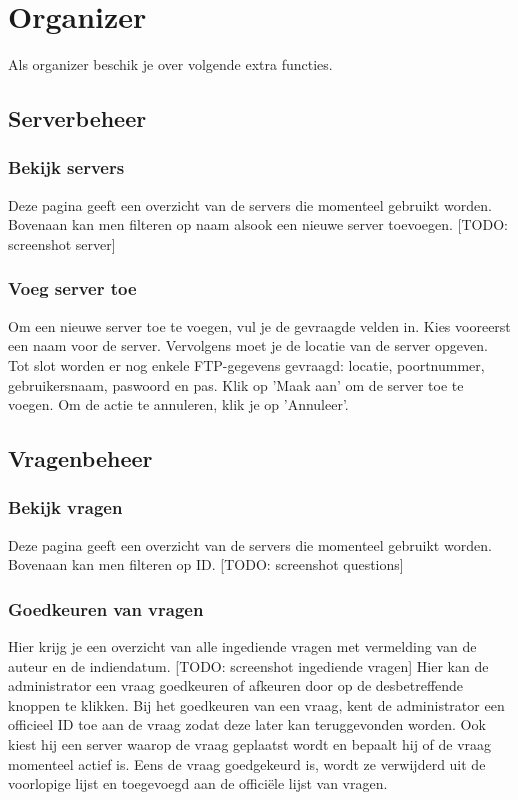 \documentclass[]{article}
\begin{document}
\section{Organizer}

Als organizer beschik je over volgende extra functies.

\subsection{Serverbeheer}

\subsubsection{Bekijk servers}
Deze pagina geeft een overzicht van de servers die momenteel gebruikt worden. Bovenaan kan men filteren op naam alsook een nieuwe server toevoegen. [TODO: screenshot server]

\subsubsection{Voeg server toe}
Om een nieuwe server toe te voegen, vul je de gevraagde velden in. Kies vooreerst een naam voor de server. Vervolgens moet je de locatie van de server opgeven. Tot slot worden er nog enkele FTP-gegevens gevraagd: locatie, poortnummer, gebruikersnaam, paswoord en pas. Klik op 'Maak aan' om de server toe te voegen. Om de actie te annuleren, klik je op 'Annuleer'.

\subsection{Vragenbeheer}

\subsubsection{Bekijk vragen}
Deze pagina geeft een overzicht van de servers die momenteel gebruikt worden. Bovenaan kan men filteren op ID. [TODO: screenshot questions]

\subsubsection{Goedkeuren van vragen}
Hier krijg je een overzicht van alle ingediende vragen met vermelding van de auteur en de indiendatum. [TODO: screenshot ingediende vragen] Hier kan de administrator een vraag goedkeuren of afkeuren door op de desbetreffende knoppen te klikken. Bij het goedkeuren van een vraag, kent de administrator een officieel ID toe aan de vraag zodat deze later kan teruggevonden worden. Ook kiest hij een server waarop de vraag geplaatst wordt en bepaalt hij of de vraag momenteel actief is. Eens de vraag goedgekeurd is, wordt ze verwijderd uit de voorlopige lijst en toegevoegd aan de officiële lijst van vragen.
\end{document}
